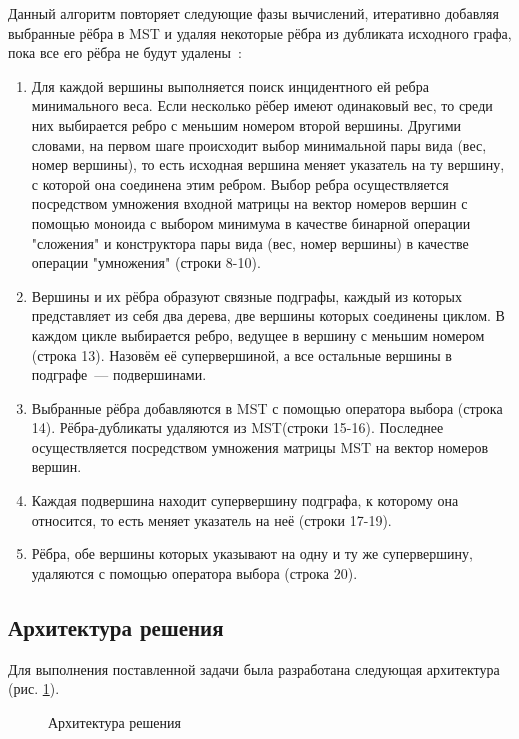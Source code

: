 \documentclass[14pt]{matmex-diploma-custom}
\begin{document}
Данный алгоритм повторяет следующие фазы вычислений, итеративно добавляя выбранные рёбра в MST и удаляя некоторые рёбра из дубликата исходного графа, пока все его рёбра не будут удалены~\cite{Boruvka}:
\begin{enumerate}
\item Для каждой вершины выполняется поиск инцидентного ей ребра минимального веса. Если несколько рёбер имеют одинаковый вес, то среди них выбирается ребро с меньшим номером второй вершины. Другими словами, на первом шаге происходит выбор минимальной пары вида (вес, номер вершины), то есть исходная вершина меняет указатель на ту вершину, с которой она соединена этим ребром. Выбор ребра осуществляется посредством умножения входной матрицы на вектор номеров вершин с помощью моноида с выбором минимума в качестве бинарной операции "сложения" и конструктора пары вида (вес, номер вершины) в качестве операции "умножения" (строки 8-10).
\item Вершины и их рёбра образуют связные подграфы, каждый из которых представляет из себя два дерева, две вершины которых соединены циклом. В каждом цикле выбирается ребро, ведущее в вершину с меньшим номером (строка 13). Назовём её супервершиной, а все остальные вершины в подграфе~--- подвершинами.
\item Выбранные рёбра добавляются в MST с помощью оператора выбора (строка 14). Рёбра-дубликаты удаляются из MST(строки 15-16). Последнее осуществляется посредством умножения матрицы MST на вектор номеров вершин. 
\item Каждая подвершина находит супервершину подграфа, к которому она относится, то есть меняет указатель на неё (строки 17-19).
\item Рёбра, обе вершины которых указывают на одну и ту же супервершину, удаляются с помощью оператора выбора (строка 20).
\end{enumerate}

\subsection{Архитектура решения}
Для выполнения поставленной задачи была разработана следующая архитектура (рис. \ref{6}).

\begin{figure}
\caption{Архитектура решения}\label{6}
\end{figure}
\end{document}
